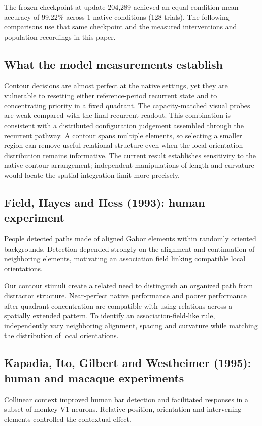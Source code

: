 \documentclass[11pt]{article}
\begin{document}
The frozen checkpoint at update 204,289 achieved an equal-condition mean accuracy of 99.22\% across 1 native conditions (128 trials). The following comparisons use that same checkpoint and the measured interventions and population recordings in this paper.

\subsection{What the model measurements establish}
Contour decisions are almost perfect at the native settings, yet they are vulnerable to resetting either reference-period recurrent state and to concentrating priority in a fixed quadrant. The capacity-matched visual probes are weak compared with the final recurrent readout. This combination is consistent with a distributed configuration judgement assembled through the recurrent pathway. A contour spans multiple elements, so selecting a smaller region can remove useful relational structure even when the local orientation distribution remains informative. The current result establishes sensitivity to the native contour arrangement; independent manipulations of length and curvature would locate the spatial integration limit more precisely.

\subsection{Field, Hayes and Hess (1993): human experiment}
People detected paths made of aligned Gabor elements within randomly oriented backgrounds. Detection depended strongly on the alignment and continuation of neighboring elements, motivating an association field linking compatible local orientations. \cite{bio_field}

Our contour stimuli create a related need to distinguish an organized path from distractor structure. Near-perfect native performance and poorer performance after quadrant concentration are compatible with using relations across a spatially extended pattern. To identify an association-field-like rule, independently vary neighboring alignment, spacing and curvature while matching the distribution of local orientations.

\subsection{Kapadia, Ito, Gilbert and Westheimer (1995): human and macaque experiments}
Collinear context improved human bar detection and facilitated responses in a subset of monkey V1 neurons. Relative position, orientation and intervening elements controlled the contextual effect. \cite{bio_kapadia}
\end{document}
